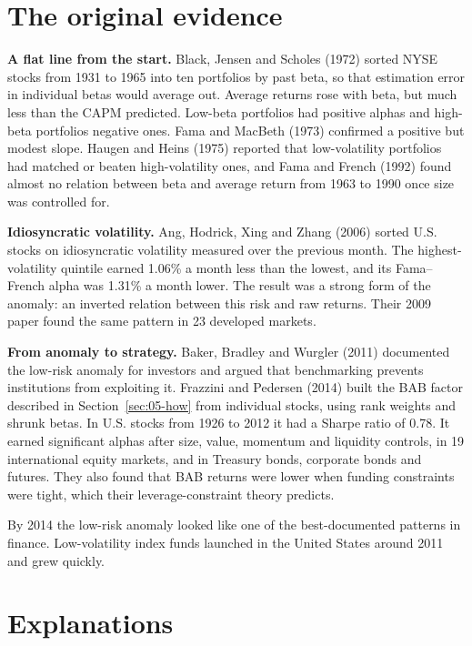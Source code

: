 \section{The original evidence}
\label{sec:05-evidence}

\textbf{A flat line from the start.} Black, Jensen and Scholes (1972) sorted NYSE stocks from 1931 to 1965 into ten portfolios by past beta, so that estimation error in individual betas would average out. Average returns rose with beta, but much less than the CAPM predicted. Low-beta portfolios had positive alphas and high-beta portfolios negative ones. Fama and MacBeth (1973) confirmed a positive but modest slope. Haugen and Heins (1975) reported that low-volatility portfolios had matched or beaten high-volatility ones, and Fama and French (1992) found almost no relation between beta and average return from 1963 to 1990 once size was controlled for.

\textbf{Idiosyncratic volatility.} Ang, Hodrick, Xing and Zhang (2006) sorted U.S. stocks on idiosyncratic volatility measured over the previous month. The highest-volatility quintile earned 1.06\% a month less than the lowest, and its Fama--French alpha was 1.31\% a month lower. The result was a strong form of the anomaly: an inverted relation between this risk and raw returns. Their 2009 paper found the same pattern in 23 developed markets.

\textbf{From anomaly to strategy.} Baker, Bradley and Wurgler (2011) documented the low-risk anomaly for investors and argued that benchmarking prevents institutions from exploiting it. Frazzini and Pedersen (2014) built the BAB factor described in Section~\ref{sec:05-how} from individual stocks, using rank weights and shrunk betas. In U.S. stocks from 1926 to 2012 it had a Sharpe ratio of 0.78. It earned significant alphas after size, value, momentum and liquidity controls, in 19 international equity markets, and in Treasury bonds, corporate bonds and futures. They also found that BAB returns were lower when funding constraints were tight, which their leverage-constraint theory predicts.

By 2014 the low-risk anomaly looked like one of the best-documented patterns in finance. Low-volatility index funds launched in the United States around 2011 and grew quickly.

\section{Explanations}
\label{sec:05-explanations}

